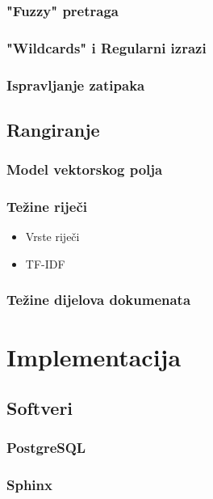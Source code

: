 \documentclass[11pt]{scrreprt}
\begin{document}
\subsection{"Fuzzy" pretraga}

\subsection{"Wildcards" i Regularni izrazi}

\subsection{Ispravljanje zatipaka}

\section{Rangiranje}

\subsection{Model vektorskog polja}

\subsection{Težine riječi}

\begin{itemize}
  \item Vrste riječi
  \item TF-IDF
\end{itemize}

\subsection{Težine dijelova dokumenata}

\chapter{Implementacija}

\section{Softveri}

\subsection{PostgreSQL}

\subsection{Sphinx}
\end{document}
